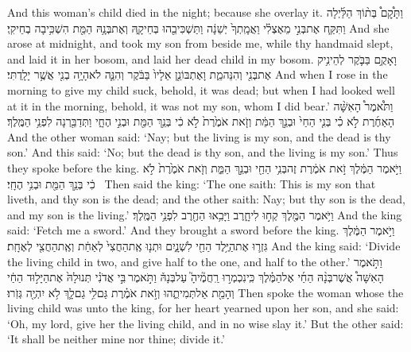 {And this woman’s child died in the night; because she overlay it.}
{וַתָּ֩קׇם֩ בְּת֨וֹךְ הַלַּ֜יְלָה וַתִּקַּ֧ח אֶת\maqqaf בְּנִ֣י מֵאֶצְלִ֗י וַאֲמָֽתְךָ֙ יְשֵׁנָ֔ה וַתַּשְׁכִּיבֵ֖הוּ בְּחֵיקָ֑הּ וְאֶת\maqqaf בְּנָ֥הּ הַמֵּ֖ת הִשְׁכִּ֥יבָה בְחֵיקִֽי׃}
{And she arose at midnight, and took my son from beside me, while thy handmaid slept, and laid it in her bosom, and laid her dead child in my bosom.}
{וָאָקֻ֥ם בַּבֹּ֛קֶר לְהֵינִ֥יק אֶת\maqqaf בְּנִ֖י וְהִנֵּה\maqqaf מֵ֑ת וָאֶתְבּוֹנֵ֤ן אֵלָיו֙ בַּבֹּ֔קֶר וְהִנֵּ֛ה לֹא\maqqaf הָיָ֥ה בְנִ֖י אֲשֶׁ֥ר יָלָֽדְתִּי׃}
{And when I rose in the morning to give my child suck, behold, it was dead; but when I had looked well at it in the morning, behold, it was not my son, whom I did bear.’}
{וַתֹּ֩אמֶר֩ הָאִשָּׁ֨ה הָאַחֶ֜רֶת לֹ֣א כִ֗י בְּנִ֤י הַחַי֙ וּבְנֵ֣ךְ הַמֵּ֔ת וְזֹ֤את אֹמֶ֙רֶת֙ לֹ֣א כִ֔י בְּנֵ֥ךְ הַמֵּ֖ת וּבְנִ֣י הֶחָ֑י וַתְּדַבֵּ֖רְנָה לִפְנֵ֥י הַמֶּֽלֶךְ׃}
{And the other woman said: ‘Nay; but the living is my son, and the dead is thy son.’ And this said: ‘No; but the dead is thy son, and the living is my son.’ Thus they spoke before the king.}
{וַיֹּ֣אמֶר הַמֶּ֔לֶךְ זֹ֣את אֹמֶ֔רֶת זֶה\maqqaf בְּנִ֥י הַחַ֖י וּבְנֵ֣ךְ הַמֵּ֑ת וְזֹ֤את אֹמֶ֙רֶת֙ לֹ֣א כִ֔י בְּנֵ֥ךְ הַמֵּ֖ת וּבְנִ֥י הֶחָֽי׃ \petucha }
{Then said the king: ‘The one saith: This is my son that liveth, and thy son is the dead; and the other saith: Nay; but thy son is the dead, and my son is the living.’}
{וַיֹּ֥אמֶר הַמֶּ֖לֶךְ קְח֣וּ לִי\maqqaf חָ֑רֶב וַיָּבִ֥אוּ הַחֶ֖רֶב לִפְנֵ֥י הַמֶּֽלֶךְ׃}
{And the king said: ‘Fetch me a sword.’ And they brought a sword before the king.}
{וַיֹּ֣אמֶר הַמֶּ֔לֶךְ גִּזְר֛וּ אֶת\maqqaf הַיֶּ֥לֶד הַחַ֖י לִשְׁנָ֑יִם וּתְנ֤וּ אֶֽת\maqqaf הַחֲצִי֙ לְאַחַ֔ת וְאֶֽת\maqqaf הַחֲצִ֖י לְאֶחָֽת׃}
{And the king said: ‘Divide the living child in two, and give half to the one, and half to the other.’}
{וַתֹּ֣אמֶר הָאִשָּׁה֩ אֲשֶׁר\maqqaf בְּנָ֨הּ הַחַ֜י אֶל\maqqaf הַמֶּ֗לֶךְ כִּֽי\maqqaf נִכְמְר֣וּ רַֽחֲמֶ֘יהָ֮ עַל\maqqaf בְּנָהּ֒ וַתֹּ֣אמֶר \legarmeh  בִּ֣י אֲדֹנִ֗י תְּנוּ\maqqaf לָהּ֙ אֶת\maqqaf הַיָּל֣וּד הַחַ֔י וְהָמֵ֖ת אַל\maqqaf תְּמִיתֻ֑הוּ וְזֹ֣את אֹמֶ֗רֶת גַּם\maqqaf לִ֥י גַם\maqqaf לָ֛ךְ לֹ֥א יִהְיֶ֖ה גְּזֹֽרוּ׃}
{Then spoke the woman whose the living child was unto the king, for her heart yearned upon her son, and she said: ‘Oh, my lord, give her the living child, and in no wise slay it.’ But the other said: ‘It shall be neither mine nor thine; divide it.’}
